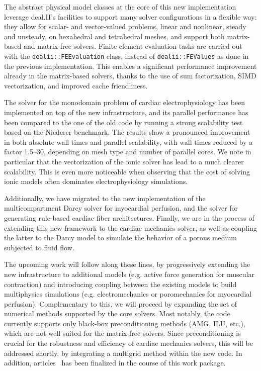 \documentclass[a4paper,12pt, numbers]{article}
\begin{document}
The abstract physical model classes at the core of this new implementation leverage deal.II's facilities to support many solver configurations in a flexible way: they allow for scalar- and vector-valued problems, linear and nonlinear, steady and unsteady, on hexahedral and tetrahedral meshes, and support both matrix-based and matrix-free solvers. Finite element evaluation tasks are carried out with the \texttt{dealii::FEEvaluation} class, instead of \texttt{dealii::FEValues} as done in the previous implementation. This enables a significant performance improvement already in the matrix-based solvers, thanks to the use of sum factorization, SIMD vectorization, and improved cache friendliness.

The solver for the monodomain problem of cardiac electrophysiology has been implemented on top of the new infrastructure, and its parallel performance has been compared to the one of the old code by running a strong scalability test based on the Niederer benchmark. The results show a pronounced improvement in both absolute wall times and parallel scalability, with wall times reduced by a factor 1.5--30, depending on mesh type and number of parallel cores. We note in particular that the vectorization of the ionic solver has lead to a much clearer scalability. This is even more noticeable when observing that the cost of solving ionic models often dominates electrophysiology simulations.

Additionally, we have migrated to the new implementation of the multicompartment Darcy solver for myocardial perfusion, and the solver for generating rule-based cardiac fiber architectures. Finally, we are in the process of extending this new framework to the cardiac mechanics solver, as well as coupling the latter to the Darcy model to simulate the behavior of a porous medium subjected to fluid flow.

The upcoming work will follow along these lines, by progressively extending the new infrastructure to additional models (e.g. active force generation for muscular contraction) and introducing coupling between the existing models to build multiphysics simulations (e.g. electromechanics or poromechanics for myocardial perfusion). Complementary to this, we will proceed by expanding the set of numerical methods supported by the core solvers. Most notably, the code currently supports only black-box preconditioning methods (AMG, ILU, etc.), which are not well suited for the matrix-free solvers. Since preconditioning is crucial for the robustness and efficiency of cardiac mechanics solvers, this will be addressed shortly, by integrating a multigrid method within the new code. In addition, articles~\cite{bucelli2025, fumagalli2025} has been finalized in the course of this work package.
\end{document}
